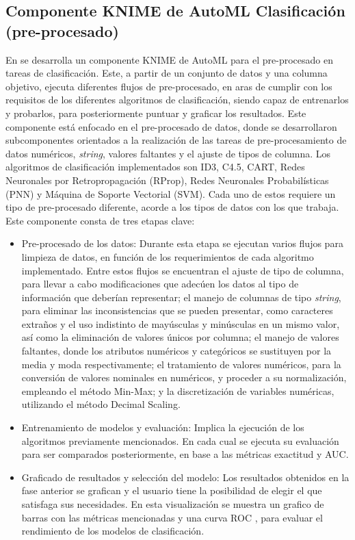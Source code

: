 \subsection{Componente KNIME de AutoML Clasificación (pre-procesado)}
En \citep{Carrazana2022} se desarrolla un componente KNIME de AutoML para el pre-procesado en tareas de clasificación. Este, a partir de un conjunto de datos y una columna objetivo, ejecuta diferentes flujos de pre-procesado, en aras de cumplir con los requisitos de los diferentes algoritmos de clasificación, siendo capaz de entrenarlos y probarlos, para posteriormente puntuar y graficar los resultados. Este componente está enfocado en el pre-procesado de datos, donde se desarrollaron subcomponentes orientados a la realización de las tareas de pre-procesamiento de datos numéricos, \textit{string}, valores faltantes y el ajuste de tipos de columna. Los algoritmos de clasificación implementados son ID3, C4.5, CART, Redes Neuronales por Retropropagación (RProp), Redes Neuronales Probabilísticas (PNN) y Máquina de Soporte Vectorial (SVM). Cada uno de estos requiere un tipo de pre-procesado diferente, acorde a los tipos de datos con los que trabaja. Este componente consta de tres etapas clave:

\begin{itemize}
	\item Pre-procesado de los datos: Durante esta etapa se ejecutan varios flujos para limpieza de datos, en función de los requerimientos de cada algoritmo implementado. Entre estos flujos se encuentran el ajuste de tipo de columna, para llevar a cabo modificaciones que adecúen los datos al tipo de información que deberían representar; el manejo de columnas de tipo \textit{string}, para eliminar las inconsistencias que se pueden presentar, como caracteres extraños y el uso indistinto de mayúsculas y minúsculas en un mismo valor, así como la eliminación de valores únicos por columna; el manejo de valores faltantes, donde los atributos numéricos y categóricos se sustituyen por la media y moda respectivamente; el tratamiento de valores numéricos, para la conversión de valores nominales en numéricos, y proceder a su normalización, empleando el método Min-Max; y la discretización de variables numéricas, utilizando el método Decimal Scaling.
	\item Entrenamiento de modelos y evaluación: Implica la ejecución de los algoritmos previamente mencionados. En cada cual se ejecuta su evaluación para ser comparados posteriormente, en base a las métricas exactitud y AUC.
	\item Graficado de resultados y selección del modelo: Los resultados obtenidos en la fase anterior se grafican y  el usuario tiene la posibilidad de elegir el que satisfaga sus necesidades. En esta visualización se muestra un grafico de barras con las métricas mencionadas y una curva ROC , para evaluar el rendimiento de los modelos de clasificación. 
\end{itemize}

